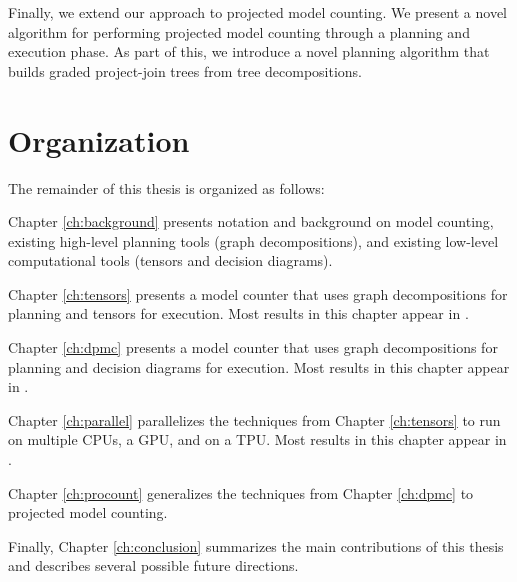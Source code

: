 Finally, we extend our approach to projected model counting. We present a novel algorithm for performing projected model counting through a planning and execution phase. As part of this, we introduce a novel planning algorithm that builds graded project-join trees from tree decompositions.

\section{Organization}
The remainder of this thesis is organized as follows:

Chapter \ref{ch:background} presents notation and background on model counting, existing high-level planning tools (graph decompositions), and existing low-level computational tools (tensors and decision diagrams). 

Chapter \ref{ch:tensors} presents a model counter  that uses graph decompositions for planning and tensors for execution. Most results in this chapter appear in \cite{DDV19}.

Chapter \ref{ch:dpmc} presents a model counter  that uses graph decompositions for planning and decision diagrams for execution. Most results in this chapter appear in \cite{dudek2020dpmc}.

Chapter \ref{ch:parallel} parallelizes the techniques from Chapter \ref{ch:tensors} to run on multiple CPUs, a GPU, and on a TPU. Most results in this chapter appear in \cite{dudek2020parallel}.

Chapter \ref{ch:procount} generalizes the techniques from Chapter \ref{ch:dpmc} to projected model counting.

Finally, Chapter \ref{ch:conclusion} summarizes the main contributions of this thesis and describes several possible future directions.